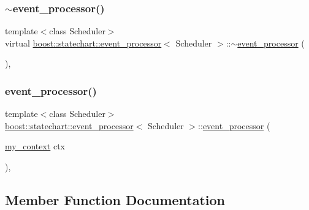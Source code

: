 \subsubsection{\texorpdfstring{$\sim$event\+\_\+processor()}{~event\_processor()}}
{\footnotesize\ttfamily template$<$class Scheduler$>$ \\
virtual \mbox{\hyperlink{classboost_1_1statechart_1_1event__processor}{boost\+::statechart\+::event\+\_\+processor}}$<$ Scheduler $>$\+::$\sim$\mbox{\hyperlink{classboost_1_1statechart_1_1event__processor}{event\+\_\+processor}} (\begin{DoxyParamCaption}{ }\end{DoxyParamCaption})\hspace{0.3cm}{\ttfamily [inline]}, {\ttfamily [virtual]}}

\mbox{\label{classboost_1_1statechart_1_1event__processor_af55129557bcd66d615c6c07e5ea47880}} 
\subsubsection{\texorpdfstring{event\+\_\+processor()}{event\_processor()}}
{\footnotesize\ttfamily template$<$class Scheduler$>$ \\
\mbox{\hyperlink{classboost_1_1statechart_1_1event__processor}{boost\+::statechart\+::event\+\_\+processor}}$<$ Scheduler $>$\+::\mbox{\hyperlink{classboost_1_1statechart_1_1event__processor}{event\+\_\+processor}} (\begin{DoxyParamCaption}\item[{\mbox{\hyperlink{classboost_1_1statechart_1_1event__processor_a99f1c6ec8419ec82f140c5c93c5eb8cd}{my\+\_\+context}}}]{ctx }\end{DoxyParamCaption})\hspace{0.3cm}{\ttfamily [inline]}, {\ttfamily [protected]}}



\subsection{Member Function Documentation}
\mbox{\label{classboost_1_1statechart_1_1event__processor_aa08d0a4e2b14026b9085efb05dbc852b}} 
